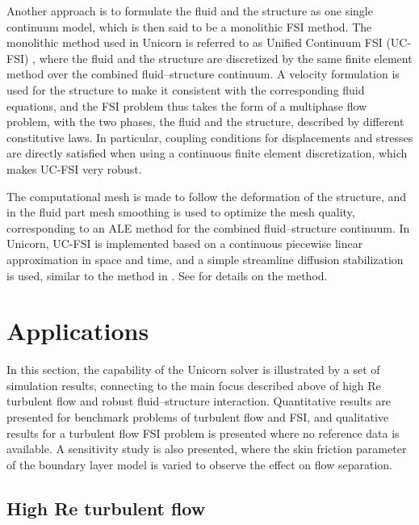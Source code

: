 Another approach is to formulate the fluid and the structure as one
single continuum model, which is then said to be a monolithic FSI
method. The monolithic method used in Unicorn is referred to as
Unified Continuum FSI (UC-FSI) \citep{HoffmanJanssonStockli2011},
where the fluid and the structure are discretized by the same finite
element method over the combined fluid--structure continuum. A
velocity formulation is used for the structure to make it consistent
with the corresponding fluid equations, and the FSI problem thus takes
the form of a multiphase flow problem, with the two phases, the fluid
and the structure, described by different constitutive laws. In
particular, coupling conditions for displacements and stresses are
directly satisfied when using a continuous finite element
discretization, which makes UC-FSI very robust.

The computational mesh is made to follow the deformation of the
structure, and in the fluid part mesh smoothing is used to optimize
the mesh quality, corresponding to an ALE method for the combined
fluid--structure continuum. In Unicorn, UC-FSI is implemented based
on a continuous piecewise linear approximation in space and time, and
a simple streamline diffusion stabilization is used, similar to the
method in \citet{Hansbo2000}. See \citet{HoffmanJanssonStockli2011}
for details on the method.

\section{Applications}

In this section, the capability of the Unicorn solver is illustrated
by a set of simulation results, connecting to the main focus described
above of high Re turbulent flow and robust fluid--structure
interaction. Quantitative results are presented for benchmark problems
of turbulent flow and FSI, and qualitative results for a turbulent
flow FSI problem is presented where no reference data is available. A
sensitivity study is also presented, where the skin friction parameter
of the boundary layer model is varied to observe the effect on flow
separation.

\subsection{High Re turbulent flow}

